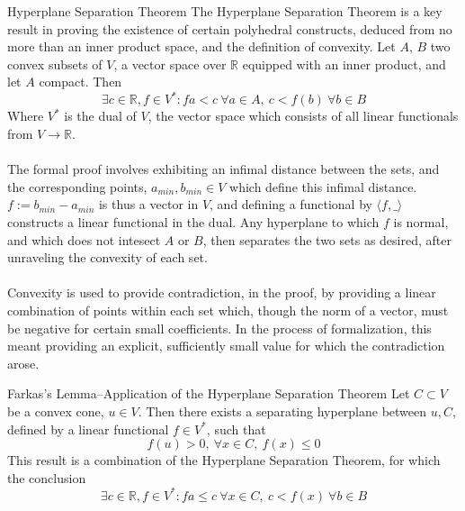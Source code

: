 \documentclass[final]{beamer}
\newlength{\colwidth}
\begin{document}
\begin{frame}[fragile]
\begin{columns}[t]
\begin{column}{\colwidth}
            \begin{alertblock}{Hyperplane Separation Theorem}
              The Hyperplane Separation Theorem is a key result in proving the existence of certain polyhedral constructs, deduced from no more than an inner product space, and the
              definition of convexity. Let $A$, $B$ two convex subsets of $V$, a vector space over $\mathbb{R}$ equipped with an inner product, and let $A$ compact. Then \begin{equation}
                \exists c\in \mathbb{R}, f \in V^*: fa < c\ \forall a\in A, \ c < f(b)\ \forall b\in B
              \end{equation} Where $V^*$ is the dual of $V$, the vector space which consists of all linear functionals from $V\to \mathbb{R}$.
              \\\\The formal proof involves exhibiting an infimal distance between the sets, and the corresponding points, $a_{min}, b_{min} \in V$ which define this infimal distance.
              $f:= b_{min}-a_{min}$ is thus a vector in $V$, and defining a functional by $\langle f, \_\rangle$ constructs a linear functional in the dual. Any hyperplane to which $f$
              is normal, and which does not intesect $A$ or $B$, then separates the two sets as desired, after unraveling the convexity of each set.
              \\\\Convexity is used to provide contradiction, in the proof, by providing a linear combination of points within each set which, though the norm of a vector,
              must be negative for certain small coefficients. In the process of formalization, this meant providing an explicit, sufficiently small value for which the contradiction arose.
             
            \end{alertblock}
             
            \begin{alertblock}{Farkas's Lemma--Application of the Hyperplane Separation Theorem}
              Let $C \subset V$ be a convex cone, $u\in V$. Then there exists a separating hyperplane between $u, C$, defined by a linear functional $f \in V^*$, such that \begin{equation}
              f(u)> 0, \ \forall x\in C, \ f(x) \le 0
              \end{equation} This result is  a combination of the Hyperplane Separation Theorem, for which the conclusion \begin{equation}
                \exists c\in \mathbb{R}, f \in V^*: fa \le c\ \forall x\in C, \ c < f(x)\ \forall b\in B
              \end{equation}
           

\end{alertblock}
\end{column}
\end{columns}
\end{frame}
\end{document}

